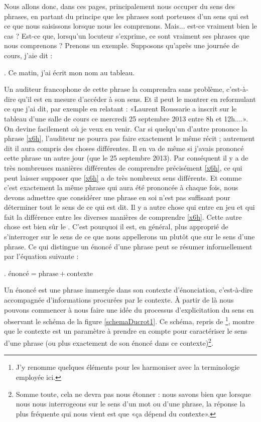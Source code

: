 \begin{refsegment}
Nous allons donc, dans ces pages, principalement nous occuper du sens des phrases,  en partant du principe que les phrases sont porteuses d'un sens qui est ce que nous saisissons lorsque nous les comprenons. Mais... est-ce vraiment bien le cas ?  Est-ce que, lorsqu'un locuteur s'exprime, ce sont vraiment ses phrases que nous comprenons ? 
Prenons un exemple.  Supposons qu'après une journée de cours, j'aie dit : 

\ex.  \label{x6h} 
Ce matin, j'ai écrit mon nom au tableau.


Un auditeur francophone de cette phrase la comprendra sans problème, c'est-à-dire qu'il est en mesure d'accéder à son sens.  Et il peut le montrer en reformulant ce que j'ai dit, par exemple en relatant : «Laurent Roussarie a inscrit  sur le  tableau d'une salle de cours ce mercredi 25 septembre 2013 entre 8h et 12h....».  On devine facilement où je veux en venir.  Car 
si quelqu'un d'autre prononce la phrase \ref{x6h}, l'auditeur ne pourra pas faire exactement le même récit ; autrement dit il aura compris des choses différentes.  Il en va de même si j'avais prononcé cette phrase un autre jour (que le 25 septembre 2013).  Par conséquent il y a de très nombreuses manières différentes de comprendre précisément \ref{x6h}, ce qui peut laisser supposer que \ref{x6h} a de très nombreux sens différents.
Et comme c'est exactement la même phrase qui aura été prononcée à chaque fois, nous devons admettre que considérer
une phrase en soi n'est pas suffisant pour déterminer tout le sens de
ce qui est dit.  Il y a autre chose qui entre en jeu et qui fait la différence entre les diverses manières de comprendre \ref{x6h}.  Cette autre chose est bien sûr le . 
C'est pourquoi il est, en général, plus approprié de s'interroger sur le sens de ce que nous appellerons un  plutôt que sur le sens d'une phrase. 
Ce qui distingue un énoncé d'une phrase peut se résumer informellement par l'équation suivante :
 
\ex. \(\text{énoncé} = \text{phrase} + \text{contexte}\)


Un énoncé est une phrase immergée dans son
contexte d'énonciation, c'est-à-dire accompagnée d'informations procurées par le contexte. 
À partir de là nous pouvons commencer à nous faire une idée du processus d'explicitation du sens  en observant le
schéma de la figure \ref{schemaDucrot1}. Ce schéma, repris de
\citet[p.~14]{Ducrot:84}\footnote{J'y renomme quelques éléments pour les harmoniser avec la terminologie employée ici.},
montre que le contexte est un paramètre à prendre en compte pour caractériser le sens d'une phrase (ou plus exactement de son énoncé dans ce contexte)\footnote{Somme toute, cela ne devra pas nous étonner : nous savons bien que lorsque nous nous interrogeons sur le sens d'un mot ou d'une phrase, la réponse la plus fréquente qui nous vient est que «ça dépend du contexte».}.



\end{refsegment}
